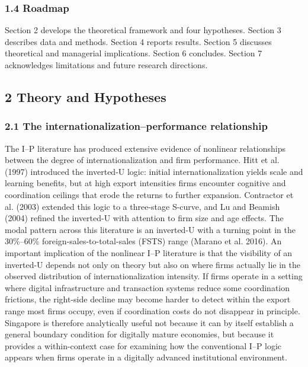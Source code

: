 \documentclass[12pt,a4paper]{article}
\begin{document}
\hypertarget{14-roadmap}{%
\subsubsection{1.4 Roadmap}\label{14-roadmap}}

Section 2 develops the theoretical framework and four hypotheses.
Section 3 describes data and methods. Section 4 reports results. Section
5 discusses theoretical and managerial implications. Section 6
concludes. Section 7 acknowledges limitations and future research
directions.

\hypertarget{2-theory-and-hypotheses}{%
\subsection{2 Theory and Hypotheses}\label{2-theory-and-hypotheses}}

\hypertarget{21-the-internationalizationperformance-relationship}{%
\subsubsection{2.1 The internationalization--performance
relationship}\label{21-the-internationalizationperformance-relationship}}

The I--P literature has produced extensive evidence of nonlinear
relationships between the degree of internationalization and firm
performance. Hitt et al. (1997) introduced the inverted-U logic: initial
internationalization yields scale and learning benefits, but at high
export intensities firms encounter cognitive and coordination ceilings
that erode the returns to further expansion. Contractor et al. (2003)
extended this logic to a three-stage S-curve, and Lu and Beamish (2004)
refined the inverted-U with attention to firm size and age effects. The
modal pattern across this literature is an inverted-U with a turning
point in the 30\%--60\% foreign-sales-to-total-sales (FSTS) range
(Marano et al. 2016). An important implication of the nonlinear I--P
literature is that the visibility of an inverted-U depends not only on
theory but also on where firms actually lie in the observed distribution
of internationalization intensity. If firms operate in a setting where
digital infrastructure and transaction systems reduce some coordination
frictions, the right-side decline may become harder to detect within the
export range most firms occupy, even if coordination costs do not
disappear in principle. Singapore is therefore analytically useful not
because it can by itself establish a general boundary condition for
digitally mature economies, but because it provides a within-context
case for examining how the conventional I--P logic appears when firms
operate in a digitally advanced institutional environment.
\end{document}
